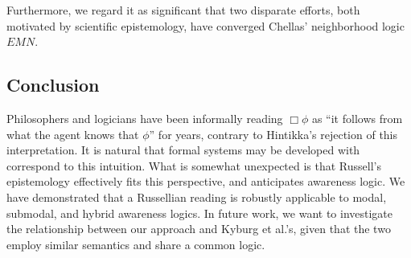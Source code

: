 Furthermore, we regard it as significant that two disparate efforts,
both motivated by scientific epistemology,
have converged Chellas' neighborhood logic $EMN$.

\subsection{Conclusion}

Philosophers and logicians have been informally reading $\Box \phi$ as
``it follows from what the agent knows that $\phi$'' for years,
contrary to Hintikka's rejection of this interpretation.  It is natural that formal systems
may be developed with correspond to this intuition.  What is somewhat
unexpected is that Russell's epistemology effectively fits this
perspective, and anticipates awareness logic.  We have demonstrated that a Russellian
reading is robustly applicable to modal, submodal, and hybrid awareness
logics.  In future work, we want to investigate the relationship
between our approach and Kyburg et al.'s, given that the two
employ similar semantics and share a common logic. 

